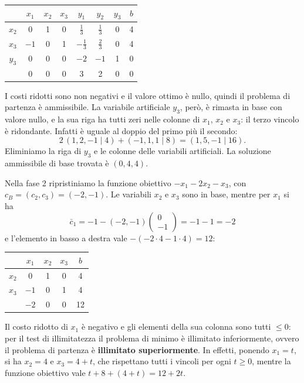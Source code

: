 \begin{center}
\begin{tabular}{c|cccccc|c}
 & $x_1$ & $x_2$ & $x_3$ & $y_1$ & $y_2$ & $y_3$ & $b$ \\
\hline
$x_2$ & 0 & 1 & 0 & $\frac13$ & $\frac13$ & 0 & 4 \\
$x_3$ & $-1$ & 0 & 1 & $-\frac13$ & $\frac23$ & 0 & 4 \\
$y_3$ & 0 & 0 & 0 & $-2$ & $-1$ & 1 & 0 \\
\hline
 & 0 & 0 & 0 & 3 & 2 & 0 & 0 \\
\end{tabular}
\end{center}
I costi ridotti sono non negativi e il valore ottimo è nullo, quindi il problema di partenza è ammissibile. La variabile artificiale $y_3$, però, è rimasta in base con valore nullo, e la sua riga ha tutti zeri nelle colonne di $x_1$, $x_2$ e $x_3$: il terzo vincolo è ridondante. Infatti è uguale al doppio del primo più il secondo:
\[
2\,(1, 2, -1 \mid 4) + (-1, 1, 1 \mid 8) = (1, 5, -1 \mid 16).
\]
Eliminiamo la riga di $y_3$ e le colonne delle variabili artificiali. La soluzione ammissibile di base trovata è $(0, 4, 4)$.

Nella fase 2 ripristiniamo la funzione obiettivo $-x_1 - 2x_2 - x_3$, con $c_B = (c_2, c_3) = (-2, -1)$. Le variabili $x_2$ e $x_3$ sono in base, mentre per $x_1$ si ha
\[
\bar{c}_1 = -1 - (-2, -1) \begin{pmatrix} 0 \\ -1 \end{pmatrix} = -1 - 1 = -2
\]
e l'elemento in basso a destra vale $-(-2 \cdot 4 - 1 \cdot 4) = 12$:
\begin{center}
\begin{tabular}{c|ccc|c}
 & $x_1$ & $x_2$ & $x_3$ & $b$ \\
\hline
$x_2$ & 0 & 1 & 0 & 4 \\
$x_3$ & $-1$ & 0 & 1 & 4 \\
\hline
 & $-2$ & 0 & 0 & 12 \\
\end{tabular}
\end{center}
Il costo ridotto di $x_1$ è negativo e gli elementi della sua colonna sono tutti $\le 0$: per il test di illimitatezza il problema di minimo è illimitato inferiormente, ovvero il problema di partenza è \textbf{illimitato superiormente}. In effetti, ponendo $x_1 = t$, si ha $x_2 = 4$ e $x_3 = 4 + t$, che rispettano tutti i vincoli per ogni $t \ge 0$, mentre la funzione obiettivo vale $t + 8 + (4 + t) = 12 + 2t$.

